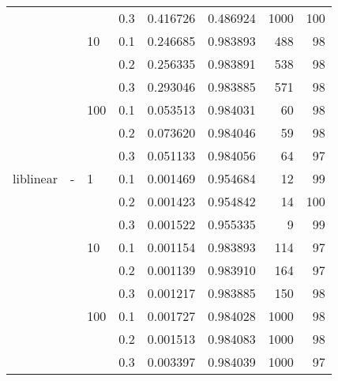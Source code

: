 \begin{table}[H]
\begin{tabular}{llllrrrr}
          &   &     & 0.3 &  0.416726 &  0.486924 &    1000 &   100 \\
          &   & 10  & 0.1 &  0.246685 &  0.983893 &     488 &    98 \\
          &   &     & 0.2 &  0.256335 &  0.983891 &     538 &    98 \\
          &   &     & 0.3 &  0.293046 &  0.983885 &     571 &    98 \\
          &   & 100 & 0.1 &  0.053513 &  0.984031 &      60 &    98 \\
          &   &     & 0.2 &  0.073620 &  0.984046 &      59 &    98 \\
          &   &     & 0.3 &  0.051133 &  0.984056 &      64 &    97 \\
liblinear & - & 1   & 0.1 &  0.001469 &  0.954684 &      12 &    99 \\
          &   &     & 0.2 &  0.001423 &  0.954842 &      14 &   100 \\
          &   &     & 0.3 &  0.001522 &  0.955335 &       9 &    99 \\
          &   & 10  & 0.1 &  0.001154 &  0.983893 &     114 &    97 \\
          &   &     & 0.2 &  0.001139 &  0.983910 &     164 &    97 \\
          &   &     & 0.3 &  0.001217 &  0.983885 &     150 &    98 \\
          &   & 100 & 0.1 &  0.001727 &  0.984028 &    1000 &    98 \\
          &   &     & 0.2 &  0.001513 &  0.984083 &    1000 &    98 \\
          &   &     & 0.3 &  0.003397 &  0.984039 &    1000 &    97 \\
\bottomrule
\end{tabular}
\end{table}
